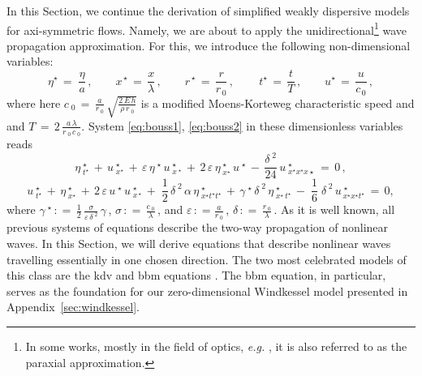 \documentclass[alpha-refs, 12pt]{wiley-article}
\newcommand{\eps}{\varepsilon}
\newcommand{\eqdef}{\mathrel{\mathop:}=}
\begin{document}
In this Section, we continue the derivation of simplified weakly dispersive models for axi-symmetric flows. Namely, we are about to apply the unidirectional\footnote{In some works, mostly in the field of optics, \emph{e.g.} \cite{Agrawal1979}, it is also referred to as the paraxial approximation.} wave propagation approximation. For this, we introduce the following non-dimensional variables:
\begin{equation*}
   \eta^{\star}\,=\;\frac{\eta}{a}\,, \qquad x^{\,\star}\,=\,\frac{x}{\lambda}\,, \qquad r^{\,\star}\,=\,\frac{r}{r_{\,0}}\,,\,\qquad t^{\star}\,=\,\frac{t}{T}\,,\qquad u^{\star}\,=\,\frac{u}{c_{\,0}}\,,
\end{equation*}
where here $c_{\;0}\,=\,\displaystyle\frac{a}{r_{\;0}}\,\sqrt{\frac{2\,E\,h}{ \rho\,r_{\;0}}}$ is a modified Moens-Korteweg characteristic speed and and $T\,=\,2\,\displaystyle\frac{a\,\lambda}{r_{\;0}\,c_{\;0}}$. System \eqref{eq:bouss1}, \eqref{eq:bouss2} in these dimensionless variables reads
\begin{equation}\label{eq:bouss1d}
  \eta^{\;\star}_{\;t^{\star}}\,+\,u^{\;\star}_{\;x^{\star}} \,+\, \eps\,\eta^{\;\star}\,u^{\;\star}_{\;x^{\;\star}}\,+\,2\,\eps\,\eta^{\;\star}_{\;x^{\star}}\,u^{\;\star}\,-\,\frac{\delta^{\;2}}{24}\,u^{\;\star}_{\;x^{\star}x^{ \star}x{\star}}\,=\,0\,,
\end{equation}
\begin{equation}\label{eq:bouss2d}
  u^{\;\star}_{\;t^{\star}}\, + \,\eta^{\;\star}_{\;x^{\star}}\, + \,2\,\eps\,u^{\;\star}\,u^{\;\star}_{\;x^{\,\star}}\, + \;\frac{1}{2}\,\delta^{\;2}\,\alpha\,\eta^{\;\star}_{\;x^{\star}t^{\star}t^{\star}}\, + \,\gamma^{\;\star}\,\delta^{\;2}\,\eta^{\;\star}_{\;x^{\star}\,t^{\star}}\, - \;\frac{1}{6}\;\delta^{\;2}\,u^{\;\star}_{\,x^{\star}x^{\star}t^{\star}}\,=\,0,
\end{equation}
where $\gamma^{\;\star}\,\eqdef\,\displaystyle\frac{1}{2}\,\frac{\sigma}{\eps\,\delta^{\;2}}\,\gamma\,$, $\sigma\,\eqdef\,\frac{c_{\;0}}{\lambda}\,$,  and $\eps\,\eqdef\frac{a}{r_{\;0}}\,$, $\delta\,\eqdef\,\frac{r_{\;0}}{\lambda}\,$. As it is well known, all previous systems of equations describe the two-way propagation of nonlinear waves. In this Section, we will derive equations that describe nonlinear waves travelling essentially in one chosen direction. The two most celebrated models of this class are the \acrshort{kdv} and \acrshort{bbm} equations \citep{KdV, bona, Bona1975a, Zabusky1971, Dutykh2013a, Dutykh2014d, Dutykh2014a}. The \acrshort{bbm} equation, in particular, serves as the foundation for our zero-dimensional Windkessel model presented in Appendix~\ref{sec:windkessel}.
\end{document}
